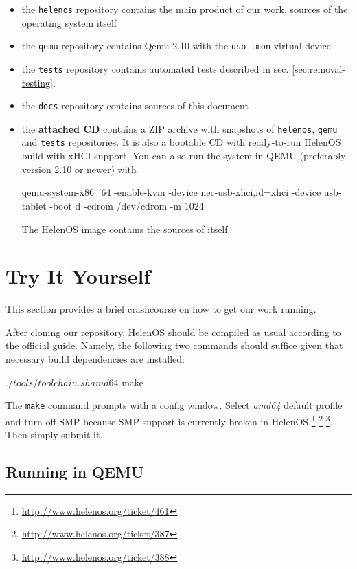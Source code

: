 \begin{itemize}
\item the \texttt{helenos} repository contains the main product of our work,
sources of the operating system itself
\item the \texttt{qemu} repository contains Qemu 2.10 with the \texttt{usb-tmon} virtual device
\item the \texttt{tests} repository contains automated tests described in sec. \ref{sec:removal-testing}.
\item the \texttt{docs} repository contains sources of this document
\item the \textbf{attached CD} contains a ZIP archive with snapshots of \texttt{helenos},
\texttt{qemu} and \texttt{tests} repositories. It is also a bootable CD with
ready-to-run HelenOS build with xHCI support. You can also run the system in
QEMU (preferably version 2.10 or newer) with
\begin{bdsh}
qemu-system-x86_64 -enable-kvm -device nec-usb-xhci,id=xhci -device usb-tablet -boot d -cdrom /dev/cdrom -m 1024
\end{bdsh}
The HelenOS image contains the sources of itself.
\end{itemize}

\section{Try It Yourself}

This section provides a brief crashcourse on how to get our work running.

After cloning our repository, HelenOS should be compiled as usual according to
the official guide. Namely, the following two commands should suffice given
that necessary build dependencies are installed:

\begin{bdsh}
$ ./tools/toolchain.sh amd64
$ make
\end{bdsh}

The \texttt{make} command prompts with a config window. Select \textit{amd64}
default profile and turn off SMP because SMP support is currently broken in
HelenOS \footnote{\href{http://www.helenos.org/ticket/461}{http://www.helenos.org/ticket/461}}
\footnote{\href{http://www.helenos.org/ticket/387}{http://www.helenos.org/ticket/387}}
\footnote{\href{http://www.helenos.org/ticket/388}{http://www.helenos.org/ticket/388}}. Then simply submit it.

\subsection{Running in QEMU}

